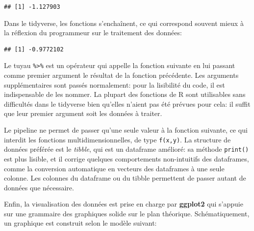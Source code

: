 \documentclass[
  12pt,
  french,
  a4paper,
  extrafontsizes,onecolumn,openright
  ]{memoir}
\newenvironment{Shaded}{\begin{snugshade}}{\end{snugshade}}
\newcommand{\CommentTok}[1]{\textcolor[rgb]{0.56,0.35,0.01}{\textit{#1}}}
\newcommand{\DataTypeTok}[1]{\textcolor[rgb]{0.13,0.29,0.53}{#1}}
\newcommand{\DecValTok}[1]{\textcolor[rgb]{0.00,0.00,0.81}{#1}}
\newcommand{\KeywordTok}[1]{\textcolor[rgb]{0.13,0.29,0.53}{\textbf{#1}}}
\newcommand{\NormalTok}[1]{#1}
\newcommand{\OperatorTok}[1]{\textcolor[rgb]{0.81,0.36,0.00}{\textbf{#1}}}
\newcommand{\StringTok}[1]{\textcolor[rgb]{0.31,0.60,0.02}{#1}}
\begin{document}
\begin{verbatim}
## [1] -1.127903
\end{verbatim}

\normalsize

Dans le tidyverse, les fonctions s'enchaînent, ce qui correspond souvent mieux à la réflexion du programmeur sur le traitement des données:

\scriptsize

\begin{Shaded}
\end{Shaded}

\begin{verbatim}
## [1] -0.9772102
\end{verbatim}

\normalsize

Le tuyau \texttt{\%\textgreater{}\%} est un opérateur qui appelle la fonction suivante en lui passant comme premier argument le résultat de la fonction précédente.
Les arguments supplémentaires sont passés normalement: pour la lisibilité du code, il est indispensable de les nommer.
La plupart des fonctions de R sont utilisables sans difficultés dans le tidyverse bien qu'elles n'aient pas été prévues pour cela: il suffit que leur premier argument soit les données à traiter.

Le pipeline ne permet de passer qu'une seule valeur à la fonction suivante, ce qui interdit les fonctions multidimensionnelles, de type \texttt{f(x,y)}.
La structure de données préférée est le \emph{tibble}, qui est un dataframe amélioré: sa méthode \texttt{print()} est plus lisible, et il corrige quelques comportements non-intuitifs des dataframes, comme la conversion automatique en vecteurs des dataframes à une seule colonne.
Les colonnes du dataframe ou du tibble permettent de passer autant de données que nécessaire.

Enfin, la visualisation des données est prise en charge par \textbf{ggplot2} qui s'appuie sur une grammaire des graphiques \autocite{Wickham2010} solide sur le plan théorique.
Schématiquement, un graphique est construit selon le modèle suivant:
\end{document}
